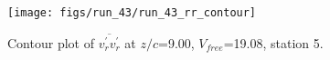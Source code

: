 \begin{figure}[H]
\centering
\texttt{[image: figs/run\_43/run\_43\_rr\_contour]}
\caption{Contour plot of $\overline{v_{r}^{\prime} v_{r}^{\prime}}$ at $z/c$=9.00, $V_{free}$=19.08, station 5.}
\label{fig:run_43_rr_contour}
\end{figure}


